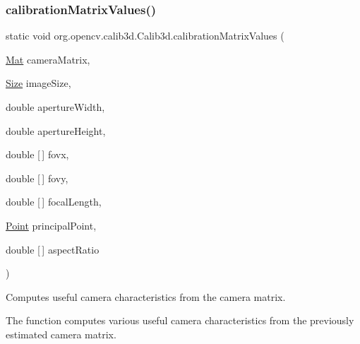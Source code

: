 \subsubsection{\texorpdfstring{calibration\+Matrix\+Values()}{calibrationMatrixValues()}}
{\footnotesize\ttfamily static void org.\+opencv.\+calib3d.\+Calib3d.\+calibration\+Matrix\+Values (\begin{DoxyParamCaption}\item[{\mbox{\hyperlink{classorg_1_1opencv_1_1core_1_1_mat}{Mat}}}]{camera\+Matrix,  }\item[{\mbox{\hyperlink{classorg_1_1opencv_1_1core_1_1_size}{Size}}}]{image\+Size,  }\item[{double}]{aperture\+Width,  }\item[{double}]{aperture\+Height,  }\item[{double \mbox{[}$\,$\mbox{]}}]{fovx,  }\item[{double \mbox{[}$\,$\mbox{]}}]{fovy,  }\item[{double \mbox{[}$\,$\mbox{]}}]{focal\+Length,  }\item[{\mbox{\hyperlink{classorg_1_1opencv_1_1core_1_1_point}{Point}}}]{principal\+Point,  }\item[{double \mbox{[}$\,$\mbox{]}}]{aspect\+Ratio }\end{DoxyParamCaption})\hspace{0.3cm}{\ttfamily [static]}}

Computes useful camera characteristics from the camera matrix.

The function computes various useful camera characteristics from the previously estimated camera matrix.



